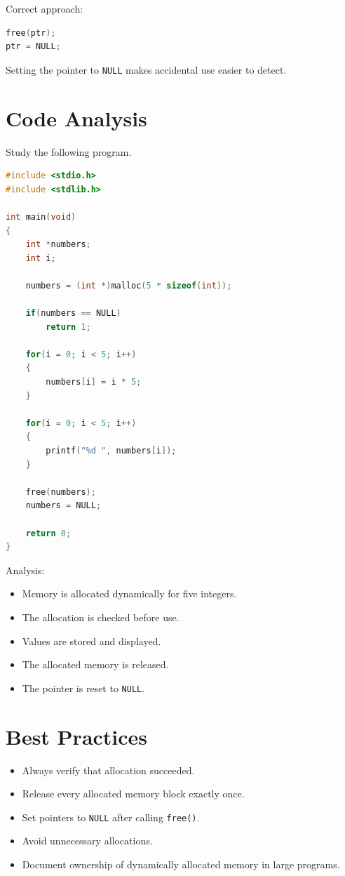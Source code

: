 \documentclass[12pt,openany]{book}
\begin{document}
Correct approach:

\begin{lstlisting}[language=C]
free(ptr);
ptr = NULL;
\end{lstlisting}

Setting the pointer to \texttt{NULL} makes accidental use easier to detect.
\section{Code Analysis}

Study the following program.

\begin{lstlisting}[language=C]
#include <stdio.h>
#include <stdlib.h>

int main(void)
{
    int *numbers;
    int i;

    numbers = (int *)malloc(5 * sizeof(int));

    if(numbers == NULL)
        return 1;

    for(i = 0; i < 5; i++)
    {
        numbers[i] = i * 5;
    }

    for(i = 0; i < 5; i++)
    {
        printf("%d ", numbers[i]);
    }

    free(numbers);
    numbers = NULL;

    return 0;
}
\end{lstlisting}

Analysis:

\begin{itemize}
    \item Memory is allocated dynamically for five integers.
    \item The allocation is checked before use.
    \item Values are stored and displayed.
    \item The allocated memory is released.
    \item The pointer is reset to \texttt{NULL}.
\end{itemize}

\section{Best Practices}

\begin{itemize}
    \item Always verify that allocation succeeded.
    \item Release every allocated memory block exactly once.
    \item Set pointers to \texttt{NULL} after calling \texttt{free()}.
    \item Avoid unnecessary allocations.
    \item Document ownership of dynamically allocated memory in large programs.
\end{itemize}
\end{document}
